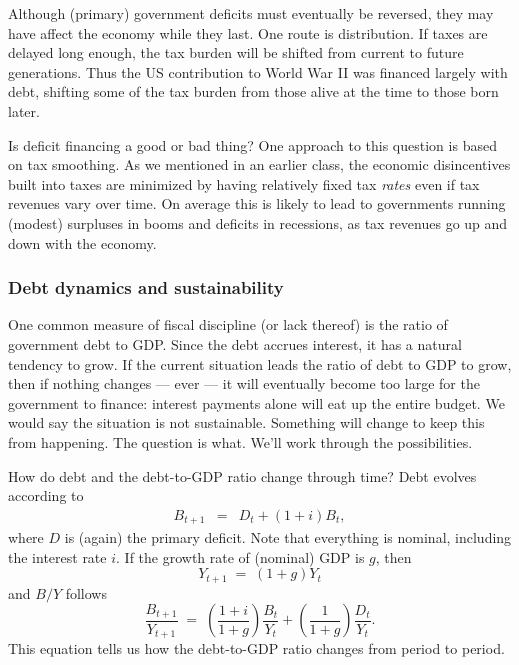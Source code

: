 \documentclass[letterpaper,12pt]{article}
\begin{document}
Although (primary) government deficits must eventually be reversed, 
they may have affect the economy while they last.  
One route is distribution.  
If taxes are delayed long enough, the tax burden 
will be shifted from current to future generations.
Thus the US contribution to World War II was financed largely with debt, 
shifting some of the tax burden from those alive at the time 
to those born later.

Is deficit financing a good or bad thing?  
One approach to this question is based on tax smoothing.
As we mentioned in an earlier class,
the economic disincentives built into taxes are minimized
by having relatively fixed tax {\it rates\/} 
even if tax revenues vary over time.
On average this is likely to lead to governments running (modest) 
surpluses in booms and deficits in recessions, 
as tax revenues go up and down with the economy.  


\subsubsection*{Debt dynamics and sustainability} 

One common measure of fiscal discipline (or lack thereof)
is the ratio of government debt to GDP.  
Since the debt accrues interest, it has a natural tendency to grow.  
If the current situation leads the ratio of debt to GDP to grow, 
then if nothing changes --- ever --- it will eventually become too large 
for the government to finance:  
interest payments alone will eat up the entire budget.  
We would say the situation is not sustainable.  
Something will change to keep this from happening.  
The question is what.  
We'll work through the possibilities.  


How do debt and the debt-to-GDP ratio change through time?  
Debt evolves according to  
\begin{eqnarray*}
    B_{t+1} &=& D_t + (1+i) B_t  ,
\end{eqnarray*}
where $D$ is (again) the primary deficit.  
Note that everything is nominal, including the interest rate $i$.  
If the growth rate of (nominal) GDP is $g$, then  
\[
    Y_{t+1} \;=\; (1+g) Y_t 
\]
and $B/Y$ follows 
\begin{equation}
    \frac{B_{t+1}}{Y_{t+1}} \;=\; 
                \left( \frac{1+i}{1+g} \right)  \frac{B_{t}}{Y_{t}} 
             +   \left( \frac{1}{1+g} \right)  \frac{D_{t}}{Y_{t}} .
    \label{eq:debtdynamics}             
\end{equation}
This equation tells us how the debt-to-GDP ratio changes 
from period to period.   
\end{document}
